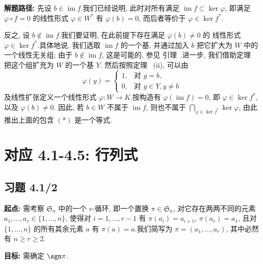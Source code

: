 \noindent\textbf{解题路径:} 先设 $b \in \operatorname{im} f$.我们已经说明, 此时对所有满足
$\operatorname{im} f \subset \ker \varphi$, 即满足 $\varphi \circ f = 0$ 的线性形式
$\varphi \in W^*$ 有 $\varphi(b) = 0$, 而后者等价于 $\varphi \in \ker f^*$.

反之, 设 $b \notin \operatorname{im} f$.我们要证明, 在此前提下存在满足 $\varphi(b) \neq 0$ 的
线性形式 $\varphi \in \ker f^*$.具体地说, 我们选取 $\operatorname{im} f$ 的一个基, 并通过加入
$b$ 把它扩大为 $W$ 中的一个线性无关组; 由于 $b \notin \operatorname{im} f$, 这是可能的, 参见
引理~.进一步, 我们借助定理~ 把这个组扩充为 $W$ 的一个基 $Y$.
然后按照定理~ (ii), 可以由
\[
\varphi(y) = \begin{cases} 1, & \text{对 } y = b, \\ 0, & \text{对 } y \in Y, y \neq b \end{cases}
\]
及线性扩张定义一个线性形式 $\varphi \colon W \longrightarrow K$.按构造有
$\varphi(\operatorname{im} f) = 0$, 即 $\varphi \in \ker f^*$, 以及 $\varphi(b) \neq 0$.
因此, 若 $b \in W$ 不属于 $\operatorname{im} f$, 则也不属于 $\bigcap_{\varphi \in \ker f^*} \ker \varphi$,
由此推出上面的包含 $(*)$ 是一个等式.









\section*{对应 4.1-4.5: 行列式}

\subsection*{习题 4.1/2}

\noindent\textbf{起点:} 需考察 $\mathfrak{S}_n$ 中的一个 $r$-循环, 即一个置换
$\pi \in \mathfrak{S}_n$, 对它存在两两不同的元素 $a_1, \ldots, a_r \in
\{1, \ldots, n\}$, 使得对 $i = 1, \ldots, r - 1$ 有 $\pi(a_i) = a_{i+1}$,
$\pi(a_r) = a_1$, 且对 $\{1, \ldots, n\}$ 的所有其余元素 $a$ 有
$\pi(a) = a$.我们简写为 $\pi = (a_1, \ldots, a_r)$, 其中必然有
$n \geq r \geq 2$.

\noindent\textbf{目标:} 需确定 $\sgn \pi$.

